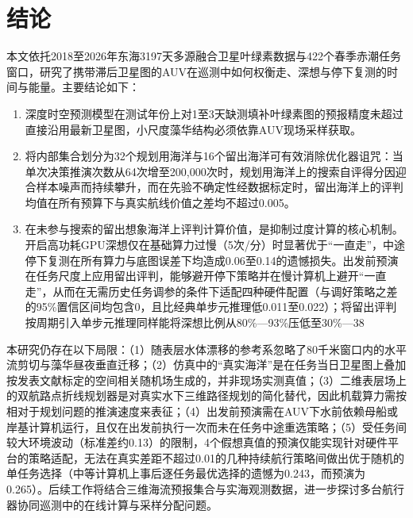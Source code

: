 \section{结论}

本文依托2018至2026年东海3197天多源融合卫星叶绿素数据与422个春季赤潮任务窗口，研究了携带滞后卫星图的AUV在巡测中如何权衡走、深想与停下复测的时间与能量。主要结论如下：
\begin{enumerate}
  \item 深度时空预测模型在测试年份上对1至3天缺测填补叶绿素图的预报精度未超过直接沿用最新卫星图，小尺度藻华结构必须依靠AUV现场采样获取。
  \item 将内部集合划分为32个规划用海洋与16个留出海洋可有效消除优化器诅咒：当单次决策推演次数从64次增至200,000次时，规划用海洋上的搜索自评得分因迎合样本噪声而持续攀升，而在先验不确定性经数据标定时，留出海洋上的评判均值在所有预算下与真实航线价值之差均不超过0.005。
  \item 在未参与搜索的留出想象海洋上评判计算价值，是抑制过度计算的核心机制。开启高功耗GPU深想仅在基础算力过慢（5次/分）时显著优于“一直走”，中途停下复测在所有算力与底图误差下均造成0.06至0.14的遗憾损失。出发前预演在任务尺度上应用留出评判，能够避开停下策略并在慢计算机上避开“一直走”，从而在无需历史任务调参的条件下适配四种硬件配置（与调好策略之差的95\%置信区间均包含0，且比经典单步元推理低0.011至0.022）；将留出评判按周期引入单步元推理同样能将深想比例从80\%—93\%压低至30\%—38%
\end{enumerate}

本研究仍存在以下局限：（1）随表层水体漂移的参考系忽略了80千米窗口内的水平流剪切与藻华昼夜垂直迁移；（2）仿真中的“真实海洋”是在任务当日卫星图上叠加按发表文献标定的空间相关随机场生成的，并非现场实测真值；（3）二维表层场上的双航路点折线规划器是对真实水下三维路径规划的简化替代，因此机载算力需按相对于规划问题的推演速度来表征；（4）出发前预演需在AUV下水前依赖母船或岸基计算机运行，且仅在出发前执行一次而未在任务中途重选策略；（5）受任务间较大环境波动（标准差约0.13）的限制，4个假想真值的预演仅能实现针对硬件平台的策略适配，无法在真实差距不超过0.01的几种持续航行策略间做出优于随机的单任务选择（中等计算机上事后逐任务最优选择的遗憾为0.243，而预演为0.265）。后续工作将结合三维海流预报集合与实海观测数据，进一步探讨多台航行器协同巡测中的在线计算与采样分配问题。
